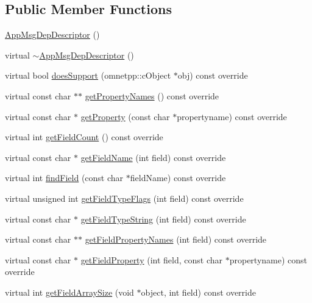 \subsection*{Public Member Functions}
\begin{DoxyCompactItemize}
\item 
\hyperlink{classAppMsgDepDescriptor_a9e34bc0dc8c5ebf87d3861c741a1ee78}{App\+Msg\+Dep\+Descriptor} ()
\item 
virtual \hyperlink{classAppMsgDepDescriptor_aef6f0e8734bc696c3e76065a642ae84e}{$\sim$\+App\+Msg\+Dep\+Descriptor} ()
\item 
virtual bool \hyperlink{classAppMsgDepDescriptor_ab9ca1804536d49681d6e681f97627c92}{does\+Support} (omnetpp\+::c\+Object $\ast$obj) const override
\item 
virtual const char $\ast$$\ast$ \hyperlink{classAppMsgDepDescriptor_a52285a3c2457062bf24e71a1b68e266d}{get\+Property\+Names} () const override
\item 
virtual const char $\ast$ \hyperlink{classAppMsgDepDescriptor_a35837c5cdbb09afde09b6cc89618899e}{get\+Property} (const char $\ast$propertyname) const override
\item 
virtual int \hyperlink{classAppMsgDepDescriptor_ad204cc9df6c39c659db4382d44bb5138}{get\+Field\+Count} () const override
\item 
virtual const char $\ast$ \hyperlink{classAppMsgDepDescriptor_abc7c71b322dd44e9e013d796a1847f98}{get\+Field\+Name} (int field) const override
\item 
virtual int \hyperlink{classAppMsgDepDescriptor_aa3197b479875191ad8c565907640832f}{find\+Field} (const char $\ast$field\+Name) const override
\item 
virtual unsigned int \hyperlink{classAppMsgDepDescriptor_a14d73b922bf64e60d2401cc2f42acc32}{get\+Field\+Type\+Flags} (int field) const override
\item 
virtual const char $\ast$ \hyperlink{classAppMsgDepDescriptor_a376972c07aabb5b32e12a38649a56aaf}{get\+Field\+Type\+String} (int field) const override
\item 
virtual const char $\ast$$\ast$ \hyperlink{classAppMsgDepDescriptor_a2b0c9bca08ff82a4d8bcedf97376a930}{get\+Field\+Property\+Names} (int field) const override
\item 
virtual const char $\ast$ \hyperlink{classAppMsgDepDescriptor_a5924764c36dbe1f3af75201a843649b6}{get\+Field\+Property} (int field, const char $\ast$propertyname) const override
\item 
virtual int \hyperlink{classAppMsgDepDescriptor_abd6a2a77ab67f6d4e59a83a4608f1a9f}{get\+Field\+Array\+Size} (void $\ast$object, int field) const override

\end{DoxyCompactItemize}
